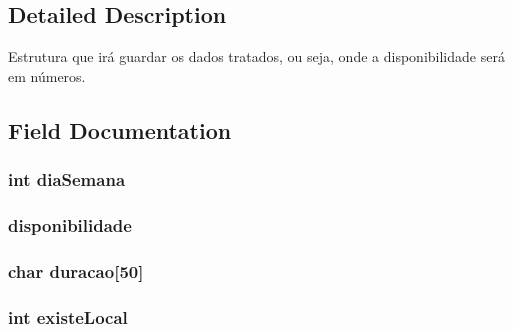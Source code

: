 \subsection{Detailed Description}
Estrutura que irá guardar os dados tratados, ou seja, onde a disponibilidade será em números. 

\subsection{Field Documentation}
\hypertarget{structlista_calendario_ae690627c5917afdb91c1cd98478cea7e}{}
\subsubsection[{dia\+Semana}]{\setlength{\rightskip}{0pt plus 5cm}int dia\+Semana}\label{structlista_calendario_ae690627c5917afdb91c1cd98478cea7e}
\hypertarget{structlista_calendario_a39461700e4a56deb19d0f72952dccb3d}{}
\subsubsection[{disponibilidade}]{ disponibilidade}\label{structlista_calendario_a39461700e4a56deb19d0f72952dccb3d}
\hypertarget{structlista_calendario_ae0b35c399889e7c6f5cd9fbd9230b295}{}
\subsubsection[{duracao}]{\setlength{\rightskip}{0pt plus 5cm}char duracao\mbox{[}50\mbox{]}}\label{structlista_calendario_ae0b35c399889e7c6f5cd9fbd9230b295}
\hypertarget{structlista_calendario_a39959b4363385a2403605ed7d5455233}{}
\subsubsection[{existe\+Local}]{\setlength{\rightskip}{0pt plus 5cm}int existe\+Local}\label{structlista_calendario_a39959b4363385a2403605ed7d5455233}
\hypertarget{structlista_calendario_abade366a6a790fc6164d1b360522e6e3}{}
